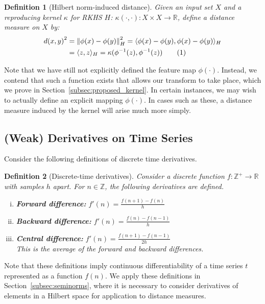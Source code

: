 \documentclass[a4paper]{article}
\newcommand\numberthis{\addtocounter{equation}{1}\tag{\theequation}}
\newcommand{\norm}[1]{\left\lVert#1\right\rVert}
\newcommand{\innerproduct}[2]{\langle{}#1,#2\rangle{}}
\theoremstyle{def}
\newtheorem{definition}{Definition}
\theoremstyle{thm}
\newcommand{\R}[0]{\mathbb{R}}
\newcommand{\Z}[0]{\mathbb{Z}}
\begin{document}
\begin{definition}[Hilbert norm-induced distance]\label{defn:norm_distance}
    Given an input set $X$ and a reproducing kernel $\kappa$ for RKHS $H$: $\kappa(\cdot, \cdot) \colon X \times X \rightarrow \R$, define a distance measure on $X$ by:
    \begin{align*}
        {d(x,y)}^2 &= \norm{\phi(x) - \phi(y)}_H^2 = \innerproduct{\phi(x) - \phi(y)}{\phi(x) - \phi(y)}_H \\
        &= \innerproduct{z}{z}_H = \kappa(\phi^{-1}(z), \phi^{-1}(z)) \numberthis
    \end{align*}
\end{definition}

Note that we have still not explicitly defined the feature map $\phi(\cdot)$.
Instead, we contend that such a function exists that allows our transform to take place, which we prove in Section~\ref{subsec:proposed_kernel}.
In certain instances, we may wish to actually define an explicit mapping $\phi(\cdot)$.
In cases such as these, a distance measure induced by the kernel will arise much more simply.

\subsection{(Weak) Derivatives on Time Series}
\label{subsec:weak_derivatives}

Consider the following definitions of discrete time derivatives.

\begin{definition}[Discrete-time derivatives]
    Consider a discrete function $f \colon \Z^+ \rightarrow \R$ with samples $h$ apart.
    For $n \in \Z$, the following derivatives are defined.
    \hfill 
    \begin{enumerate}[(i)]
        \item \textbf{Forward difference:} $f'(n) = \frac{f(n+1) - f(n)}{h}$
        \item \textbf{Backward difference:} $f'(n) = \frac{f(n) - f(n-1)}{h}$
        \item \textbf{Central difference:} $f'(n) = \frac{f(n+1) - f(n-1)}{2h}$\\
            This is the average of the forward and backward differences.
    \end{enumerate}
\end{definition}

Note that these definitions imply continuous differentiability of a time series $t$ represented as a function $f(n)$.
We apply these definitions in Section~\ref{subsec:seminorms}, where it is necessary to consider derivatives of elements in a Hilbert space for application to distance measures.
\end{document}

